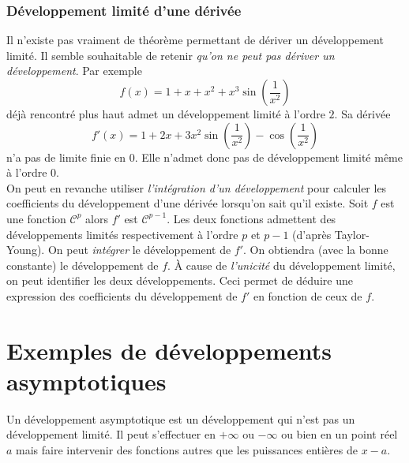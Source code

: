 \subsubsection{Développement limité d'une dérivée}
 Il n'existe pas vraiment de théorème permettant de dériver un développement limité. Il semble souhaitable de retenir \emph{qu'on ne peut pas dériver un développement}. Par exemple
\begin{displaymath}
 f(x) = 1+x+x^2 + x^3\sin(\frac{1}{x^2})
\end{displaymath}
déjà rencontré plus haut admet un développement limité à l'ordre $2$. Sa dérivée
\begin{displaymath}
 f'(x)= 1+2x+3x^2\sin(\frac{1}{x^2}) - \cos(\frac{1}{x^2})
\end{displaymath}
n'a pas de limite finie en $0$. Elle n'admet donc pas de développement limité même à l'ordre $0$.\\
On peut en revanche utiliser \emph{l'intégration d'un développement} pour calculer les coefficients du développement d'une dérivée lorsqu'on sait qu'il existe.\newline
Soit $f$ est une fonction $\mathcal C^p$ alors $f'$ est $\mathcal C^{p-1}$. Les deux fonctions admettent des développements limités respectivement à l'ordre $p$ et $p-1$ (d'après Taylor-Young).\newline
On peut \emph{intégrer} le développement de $f'$. On obtiendra (avec la bonne constante) le développement de $f$. \`A cause de \emph{l'unicité} du développement limité, on peut identifier les deux développements. Ceci permet de déduire une expression des coefficients du développement de $f'$ en fonction de ceux de $f$.

\section{Exemples de développements asymptotiques}
Un développement asymptotique est un développement qui n'est pas un développement limité. Il peut s'effectuer en $+\infty$ ou $-\infty$ ou bien en un point réel $a$ mais faire intervenir des fonctions autres que les puissances entières de $x-a$.

